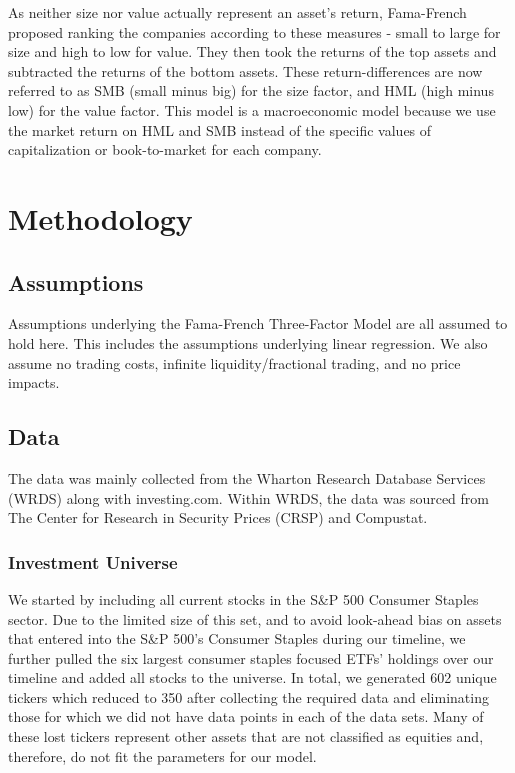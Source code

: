 \documentclass[final]{article}
\begin{document}
As neither size nor value actually represent an asset's return, Fama-French proposed ranking the companies according to these measures - small to large for size and high to low for value. They then took the returns of the top assets and subtracted the returns of the bottom assets. These return-differences are now referred to as SMB (small minus big) for the size factor, and HML (high minus low) for the value factor. This model is a macroeconomic model because we use the market return on HML and SMB instead of the specific values of capitalization or book-to-market for each company.

\section{Methodology}

\subsection{Assumptions}
\hspace{\parindent}Assumptions underlying the Fama-French Three-Factor Model are all assumed to hold here. This includes the assumptions underlying linear regression. We also assume no trading costs, infinite liquidity/fractional trading, and no price impacts.

\subsection{Data}
\hspace{\parindent}The data was mainly collected from the Wharton Research Database Services (WRDS) along with investing.com. Within WRDS, the data was sourced from The Center for Research in Security Prices (CRSP) and Compustat.

\subsubsection{Investment Universe}
\hspace{\parindent}We started by including all current stocks in the S\&P 500 Consumer Staples sector. Due to the limited size of this set, and to avoid look-ahead bias on assets that entered into the S\&P 500's Consumer Staples during our timeline, we further pulled the six largest consumer staples focused ETFs' holdings over our timeline and added all stocks to the universe. In total, we generated 602 unique tickers which reduced to 350 after collecting the required data and eliminating those for which we did not have data points in each of the data sets. Many of these lost tickers represent other assets that are not classified as equities and, therefore, do not fit the parameters for our model.
\end{document}
